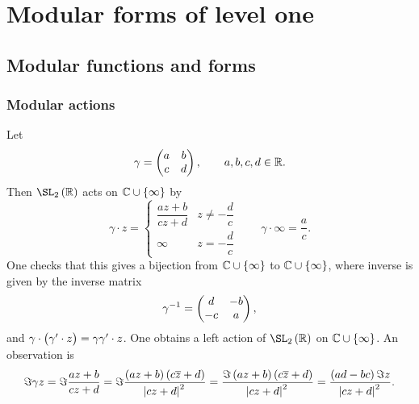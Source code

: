 \pagebreak

\section{Modular forms of level one}

\subsection{Modular functions and forms}

\subsubsection{Modular actions}

Let
$$ \gamma = \begin{pmatrix} a & b \\ c & d \end{pmatrix}, \qquad a, b, c, d \in \mathbb{R}. $$
Then $ \SL_2\br{\RR} $ acts on $ \CC \cup \cbr{\infty} $ by
$$ \gamma \cdot z =
\begin{cases}
\dfrac{az + b}{cz + d} & z \ne -\dfrac{d}{c} \\
\infty & z = -\dfrac{d}{c}
\end{cases}
\qquad \gamma \cdot \infty = \dfrac{a}{c}.
$$
One checks that this gives a bijection from $ \CC \cup \cbr{\infty} $ to $ \CC \cup \cbr{\infty} $, where inverse is given by the inverse matrix
$$ \gamma^{-1} = \begin{pmatrix} d & -b \\ -c & a \end{pmatrix}, $$
and $ \gamma \cdot \br{\gamma' \cdot z} = \gamma\gamma' \cdot z $. One obtains a left action of $ \SL_2\br{\RR} $ on $ \CC \cup \cbr{\infty} $. An observation is
$$ \Im \gamma z = \Im \dfrac{az + b}{cz + d} = \Im \dfrac{\br{az + b}\br{c\overline{z} + d}}{\abs{cz + d}^2} = \dfrac{\Im \br{az + b}\br{c\overline{z} + d}}{\abs{cz + d}^2} = \dfrac{\br{ad - bc}\Im z}{\abs{cz + d}^2}. $$



